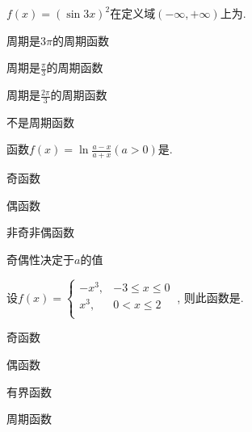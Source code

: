 			\begin{problem}
				$f\left( x \right) = \left( \sin 3x \right)^{2}$在定义域$\left( - \infty, + \infty \right)$上为.
				
				
				\begin{abcd} \item 周期是$\displaystyle 3\pi$的周期函数
					
					\item 周期是$\displaystyle \frac{\pi}{3}$的周期函数
					
					\item 周期是$\displaystyle \frac{2\pi}{3}$的周期函数
					
					\item 不是周期函数
					
			\end{abcd}  \end{problem}
			
			\begin{problem}
				函数$\displaystyle f\left( x \right) = \ln\frac{a - x}{a + x}\left( a > 0 \right)$是\pickin{A}.
				
				
				\begin{abcd} \item 奇函数
					
					\item 偶函数
					
					\item 非奇非偶函数
					
					\item 奇偶性决定于$a$的值
					
			\end{abcd}  \end{problem}
			
			\begin{problem}
				设$f\left( x \right) = \left\{ \begin{matrix}
				-x^{3}, & - 3 \leq x \leq 0 \\
				x^{3},  & 0 < x \leq 2 \\
				\end{matrix} \right.\ $, 则此函数是\pickin{C}.
				
				
				\begin{abcd} \item 奇函数
					
					\item 偶函数
					
					\item 有界函数
					
					\item 周期函数
					
			\end{abcd}  \end{problem}
			
